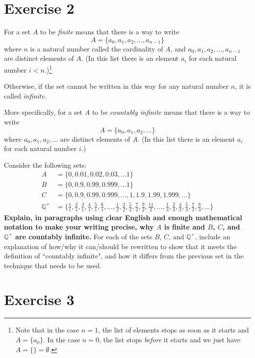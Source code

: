 \documentclass{article}
\begin{document}
\newpage

\section*{Exercise 2}
 For a set $A$ to be \emph{finite} means that there is a way to write 
 \[A = \{a_0,a_1,a_2,\ldots, a_{n-1}\}\]
 where $n$ is a natural number called the cardinality of $A$, and $a_0,a_1,a_2,\ldots, a_{n-1}$ are distinct elements of $A$. (In this list there is an element $a_i$ for each natural number $i < n$.)\footnote{Note that in the case $n = 1$, the list of elements stops as soon as it starts and $A = \{a_0\}$.  In the case $n = 0$, the list stops \emph{before} it starts and we just have $A = \{\} = \emptyset$.}
 
 Otherwise, if the set cannot be written in this way for any natural number $n$, it is called \emph{infinite}.
 
 More specifically, for a set $A$ to be \emph{countably infinite} means that there is a way to write 
 \[A = \{a_0,a_1,a_2,\ldots\}\]
 where $a_0, a_1, a_2,\ldots$ are distinct elements of $A$.  (In this list there is an element $a_i$ for each natural number $i$.)

Consider the following sets:
\begin{align*}
A &= \{0,0.01, 0.02, 0.03, \ldots 1\}\\
B &= \{0,0.9, 0.99, 0.999, \ldots 1\}\\
C &= \{0,0.9, 0.99, 0.999, \ldots, 1,1.9, 1.99, 1.999, \ldots\}\\
\mathbb{Q}^+ &= \{\textstyle \frac{1}{1}, \frac{2}{1}, \frac{3}{1}, \frac{4}{1}, \frac{5}{1}, \frac{6}{1}, \ldots, \frac{1}{2}, \frac{3}{2}, \frac{5}{2}, \frac{7}{2}, \frac{9}{2}, \frac{11}{2}, \ldots, \frac{1}{3},\frac{2}{3}, \frac{4}{3}, \frac{5}{3}, \frac{7}{3}, \frac{8}{3},\ldots\}
\end{align*}
\textbf{Explain, in paragraphs using clear English and enough mathematical notation to make your writing precise, why $A$ is finite and $B$, $C$, and $\mathbb{Q}^+$ are countably infinite.}  For each of the sets $B$, $C$, and $\mathbb{Q}^+$, include an explanation of how/why it can/should be rewritten to show that it meets the definition of ``countably infinite", and how it differs from the previous set in the technique that needs to be used.

\newpage

\section*{Exercise 3}
\end{document}
